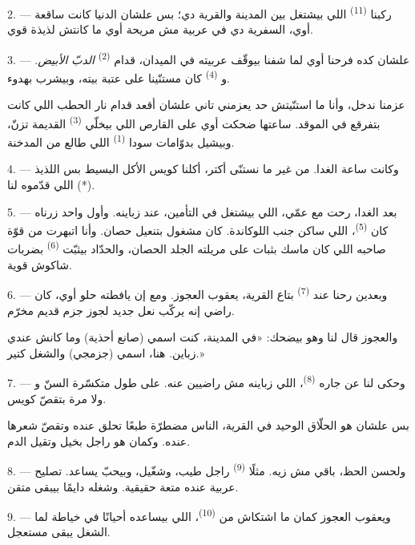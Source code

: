 2. --- ركبنا  \textsuperscript{(11)} اللي بيشتغل بين المدينة
والقرية دي؛ بس علشان الدنيا كانت ساقعة أوي، السفرية دي في عربية مش مريحة أوي
ما كانتش لذيذة قوي.

3. --- علشان كده فرحنا أوي لما شفنا  بيوقّف عربيته في الميدان،
قدام  \textsuperscript{(2)} \textit{الدبّ الأبيض}. و \textsuperscript{(4)} كان مستنّينا على عتبة بيته، وبيشرب 
بهدوء.

عزمنا ندخل، وأنا ما استنّيتش حد يعزمني تاني علشان أقعد قدام نار الحطب اللي
كانت بتفرقع في الموقد. ساعتها ضحكت أوي على  القارص اللي
بيخلّي  \textsuperscript{(3)} القديمة تزنّ، وبيشيل بدوّامات سودا
 \textsuperscript{(1)} اللي طالع من المدخنة.

4. --- وكانت ساعة الغدا. من غير ما نستنّى أكتر، أكلنا كويس الأكل البسيط بس
اللذيذ اللي قدّموه لنا (*).

\VUsaut{3.0mm}

5. --- بعد الغدا، رحت مع عمّي، اللي بيشتغل في التأمين، عند زباينه. وأول واحد
زرناه كان  \textsuperscript{(5)}، اللي ساكن جنب اللوكاندة. كان مشغول
بتنعيل حصان. وأنا اتبهرت من قوّة صاحبه اللي كان ماسك بثبات على مريلته الجلد
 الحصان، والحدّاد بيثبّت  \textsuperscript{(6)} بضربات
شاكوش قوية.

6. --- وبعدين رحنا عند  \textsuperscript{(7)} بتاع القرية، يعقوب
العجوز. ومع إن يافطته  حلو أوي، كان راضي إنه يركّب نعل جديد لجوز
جزم قديم مخرّم.

والعجوز قال لنا وهو بيضحك: «في المدينة، كنت اسمي (صانع أحذية) وما كانش عندي
زباين. هنا، اسمي (جزمجي) والشغل كتير.»

7. --- وحكى لنا عن جاره  \textsuperscript{(8)}، اللي زباينه مش
راضيين عنه.  على طول متكسّرة السنّ و ولا مرة
بتقصّ كويس.

بس علشان هو الحلّاق الوحيد في القرية، الناس مضطرّة طبعًا تحلق عنده وتقصّ شعرها
عنده. وكمان هو راجل بخيل وتقيل الدم.

8. --- ولحسن الحظ، باقي  مش زيه. مثلًا 
\textsuperscript{(9)} راجل طيب، وشغّيل، وبيحبّ يساعد. تصليح عربية عنده متعة حقيقية.
وشغله دايمًا بيبقى متقن.

9. --- ويعقوب العجوز كمان ما اشتكاش من  \textsuperscript{(10)}، اللي
بيساعده أحيانًا في خياطة  لما الشغل يبقى مستعجل.

